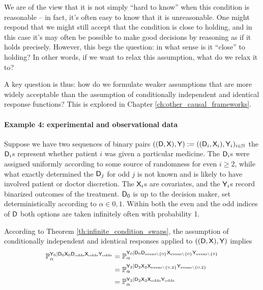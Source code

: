 We are of the view that it is not simply ``hard to know'' when this condition is reasonable -- in fact, it's often easy to know that it is unreasonable. One might respond that we might still accept that the condition is close to holding, and in this case it's may often be possible to make good decisions by reasoning as if it holds precisely. However, this begs the question: in what sense is it ``close'' to holding? In other words, if we want to relax this assumption, what do we relax it to?

A key question is thus: how do we formulate weaker assumptions that are more widely acceptable than the assumption of conditionally independent and identical response functions? This is explored in Chapter \ref{ch:other_causal_frameworks}.

\paragraph{Example 4: experimental and observational data}

Suppose we have two sequences of binary pairs $((\mathsf{D},\mathsf{X}),\mathsf{Y}):=((\mathsf{D}_i,\mathsf{X}_i),\mathsf{Y}_i)_{i\in \mathbb{N}}$ the $\mathsf{D}_i$s represent whether patient $i$ was given a particular medicine. The $\mathsf{D}_i$s were assigned uniformly according to some source of randomness for even $i\geq 2$, while what exactly determined the $\mathsf{D}_j$ for odd $j$ is not known and is likely to have involved patient or doctor discretion. The $\mathsf{X}_i$s are covariates, and the $\mathsf{Y}_i$s record binarized outcomes of the treatment. $\mathsf{D}_0$ is up to the decision maker, set deterministically according to $\alpha\in 0,1$. Within both the even and the odd indices of $\mathsf{D}$ both options are taken infinitely often with probability 1.

According to Theorem \ref{th:infinite_condition_swaps}, the assumption of conditionally independent and identical responses applied to $((\mathsf{D},\mathsf{X}),\mathsf{Y})$ implies
\begin{align}
    \mathbb{P}_\alpha^{\mathsf{Y}_0|\mathsf{D}_0\mathsf{X}_0\mathsf{D}_{\text{odds}}\mathsf{X}_{\text{odds}}\mathsf{Y}_{\text{odds}}}&=\mathbb{P}_\alpha^{\mathsf{Y}_0|\mathsf{D}_0\mathsf{D}_{\text{evens}\setminus\{0\}}\mathsf{X}_{\text{evens}\setminus\{0\}}\mathsf{Y}_{\text{evens}\setminus\{0\}}}\\
    &=\mathbb{P}_\alpha^{\mathsf{Y}_2|\mathsf{D}_2\mathsf{X}_2\mathsf{X}_{\text{evens}\setminus\{0,2\}}\mathsf{Y}_{\text{evens}\setminus\{0,2\}}}\\
    &=\mathbb{P}_\alpha^{\mathsf{Y}_2|\mathsf{D}_2\mathsf{X}_2\mathsf{X}_{\text{odds}}\mathsf{Y}_{\text{odds}}}
\end{align}

